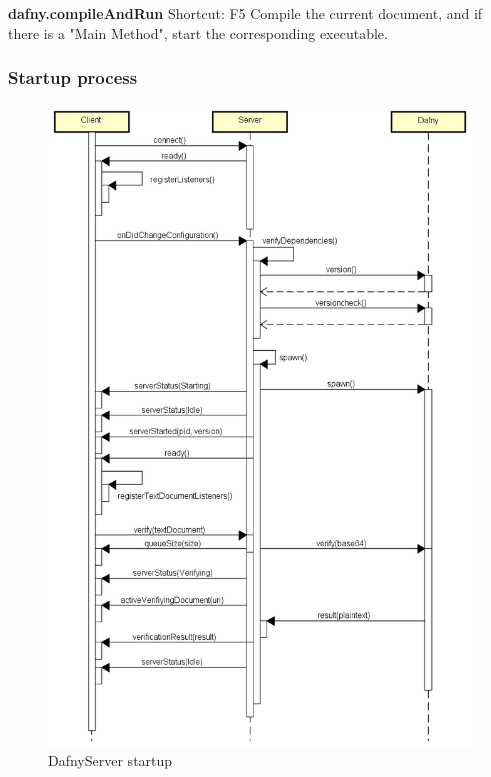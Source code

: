 \textbf{dafny.compileAndRun}
Shortcut: F5
\newline
Compile the current document, and if there is a "Main Method", start the corresponding executable. \newline


\subsubsection{Startup process}
\begin{figure}[H]
	\centering
	\includegraphics[width=1\textwidth]{img/DafnyStartupFull}
	\caption{DafnyServer startup}
	\label{fig:DafnyServer startup}
\end{figure}

